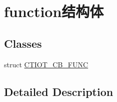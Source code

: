 \hypertarget{group___xE6_xB3_xA8_xE5_x86_x8Ccallback}{}\section{function结构体}
\label{group___xE6_xB3_xA8_xE5_x86_x8Ccallback}
\subsection*{Classes}
\begin{DoxyCompactItemize}
\item 
struct \mbox{\hyperlink{struct_c_t_i_o_t___c_b___f_u_n_c}{C\+T\+I\+O\+T\+\_\+\+C\+B\+\_\+\+F\+U\+NC}}
\end{DoxyCompactItemize}


\subsection{Detailed Description}
